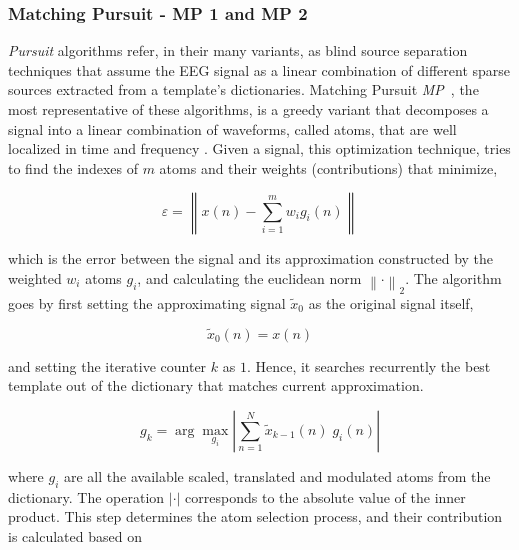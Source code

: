 \subsubsection{Matching Pursuit - MP 1 and MP 2}

\textit{Pursuit} algorithms refer, in their many variants, as blind source separation \cite{Vincent2010} techniques that assume the EEG signal as a linear combination of different sparse sources extracted from a template's dictionaries.  Matching Pursuit \textit{MP}~\cite{Mallat1993}, the most representative of these algorithms, is a greedy variant that decomposes a signal into a linear combination of waveforms, called atoms, that are well localized in time and frequency \cite{ChandranKS2016}.  Given a signal, this optimization technique, tries to find the indexes of $m$ atoms and their weights (contributions) that minimize,


\begin{equation}
\varepsilon =  \left\lVert   x(n) - \sum_{i=1}^{m} w_i g_{i}(n)   \right\rVert
\label{eq:mperror}
\end{equation}

\noindent which is the error between the signal and its approximation constructed by the weighted $w_i$ atoms $g_{i}$, and calculating the euclidean norm ${\left\lVert \cdot \right\rVert}_{2}$.  The algorithm goes by first setting the approximating signal $\tilde{x}_{0}$  as the original signal itself,  

\begin{equation}
\tilde{x}_{0}(n) = x(n)
\label{eq:mp2}
\end{equation}

\noindent and setting the iterative counter $k$ as $1$. Hence, it searches recurrently the best template out of the dictionary  that matches current approximation.  

\begin{equation}
g_{k} = \arg \max_{g_{i}} \left\lvert  \sum_{n=1}^{N} \tilde{x}_{k-1}(n) \; g_{i}(n) \right\rvert 
\label{eq:mp3}
\end{equation}

\noindent where $g_{i}$ are all the available scaled, translated and modulated atoms from the dictionary.  The operation $\left\lvert \cdot \right\rvert$ corresponds to the absolute value of the inner product.  This step determines the atom selection process, and their contribution is calculated based on 



